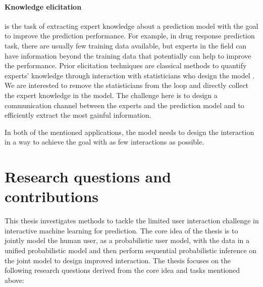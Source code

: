 \documentclass[dissertation,math,vertlayout,pdfa,colorlinks]{aaltoseries}
\begin{document}
\paragraph{Knowledge elicitation} is the task of extracting expert knowledge about a prediction model with the goal to improve the prediction performance. For example, in drug response prediction task, there are usually few training data available, but experts in the field can have information beyond the training data that potentially can help to improve the performance. Prior elicitation techniques are classical methods to quantify experts' knowledge through interaction with statisticians who design the model \cite{OHagan06}. We are interested to remove the statisticians from the loop and directly collect the expert knowledge in the model. The challenge here is to design a communication channel between the experts and the prediction model and to efficiently extract the most gainful information.   

In both of the mentioned applications, the model needs to design the interaction in a way to achieve the goal with as few interactions as possible.  





 
\section{Research questions and contributions}


This thesis investigates methods to tackle the limited user interaction challenge in interactive machine learning for prediction. %
The core idea of the thesis is to jointly model the human user, as a probabilistic user model, with the data in a unified probabilistic model and then perform sequential probabilistic inference on the joint model to design improved interaction.  The thesis focuses on the following research questions derived from the core idea and tasks mentioned above:\\
\end{document}
